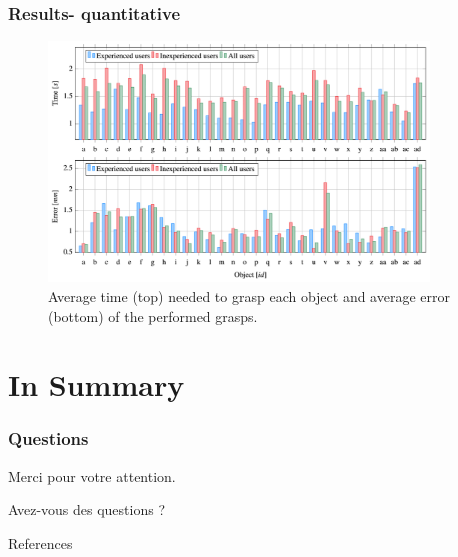 \documentclass{beamer}
\theoremstyle{remark}
\theoremstyle{plain}
\begin{document}
\begin{frame}
\frametitle{Results- quantitative}

\begin{figure}
	\centering
	\includegraphics[width=0.9\textwidth]{images/results}
	\caption{Average time (top) needed to grasp each object and average error (bottom) of the performed grasps.}
\end{figure}

\end{frame}

\section{In Summary}



\begin{frame}
  \frametitle{Questions}
  \begin{center}
    Merci pour votre attention.

    Avez-vous des questions ?
  \end{center}
\end{frame}

\setcounter{lastframe}{\insertframenumber}

\begin{frame}[allowframebreaks]{References}


\end{frame}

\setcounter{framenumber}{\thelastframe}
\end{document}
